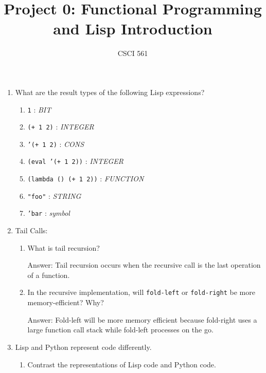 \documentclass[12pt,letterpaper]{ntdhw}
\title{Project 0: Functional Programming and Lisp Introduction}
\author{CSCI 561}
\begin{document}
\pagestyle{fancyplain}

\maketitle
\thispagestyle{fancyplain}

\begin{enumerate}

  \item What are the result types of the following Lisp expressions?
  \begin{enumerate}
    \item {\tt 1} : \emph{
      BIT
    }
    \item {\tt (+ 1 2)} : \emph{
      INTEGER
    }
    \item {\tt '(+ 1 2)} : \emph{
      CONS
    }
    \item {\tt (eval '(+ 1 2))} : \emph{
      INTEGER
    }
    \item {\tt (lambda () (+ 1 2))} : \emph{
      FUNCTION
    }
    \item {\tt "foo"} : \emph{
      STRING
    }
    \item {\tt 'bar} : \emph{
      symbol
    }
  \end{enumerate}

  \item Tail Calls:
  \begin{enumerate}
    \item What is tail recursion?

    \begin{emph}
      Answer: Tail recursion occurs when the recursive call is the last operation of a function.
    \end{emph}

    \item In the recursive implementation, will {\tt fold-left} or
    {\tt fold-right} be more memory-efficient?  Why?

    \begin{emph}
      Answer: Fold-left will be more memory efficient because fold-right uses a large function call stack while fold-left processes on the go.
    \end{emph}
  \end{enumerate}

  \item Lisp and Python represent code differently.

  \begin{enumerate}
    \item Contrast the representations of Lisp code and Python code.


\end{enumerate}
\end{enumerate}
\end{document}
